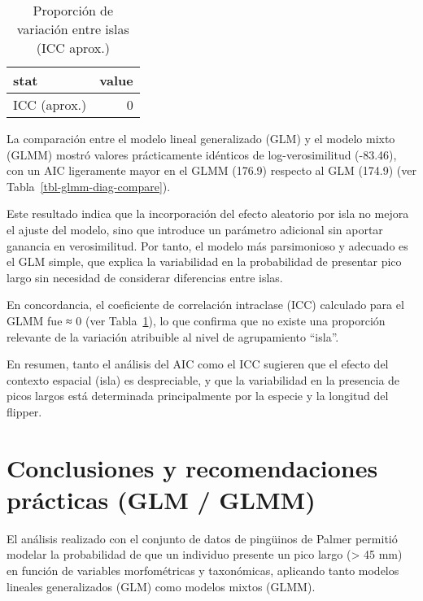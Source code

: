 \documentclass[
  spanish,
  11pt,
  a4paper,
  DIV=11,
  numbers=noendperiod]{scrartcl}
\begin{document}
\begin{longtable}[]{@{}lr@{}}

\caption{\label{tbl-glmm-logistic}Proporción de variación entre islas
(ICC aprox.)}

\tabularnewline

\toprule\noalign{}
stat & value \\
\midrule\noalign{}
\endhead
\bottomrule\noalign{}
\endlastfoot
ICC (aprox.) & 0 \\

\end{longtable}

La comparación entre el modelo lineal generalizado (GLM) y el modelo
mixto (GLMM) mostró valores prácticamente idénticos de log-verosimilitud
(-83.46), con un AIC ligeramente mayor en el GLMM (176.9) respecto al
GLM (174.9) (ver Tabla~\ref{tbl-glmm-diag-compare}).

Este resultado indica que la incorporación del efecto aleatorio por isla
no mejora el ajuste del modelo, sino que introduce un parámetro
adicional sin aportar ganancia en verosimilitud. Por tanto, el modelo
más parsimonioso y adecuado es el GLM simple, que explica la
variabilidad en la probabilidad de presentar pico largo sin necesidad de
considerar diferencias entre islas.

En concordancia, el coeficiente de correlación intraclase (ICC)
calculado para el GLMM fue ≈ 0 (ver Tabla~\ref{tbl-glmm-logistic}), lo
que confirma que no existe una proporción relevante de la variación
atribuible al nivel de agrupamiento ``isla''.

En resumen, tanto el análisis del AIC como el ICC sugieren que el efecto
del contexto espacial (isla) es despreciable, y que la variabilidad en
la presencia de picos largos está determinada principalmente por la
especie y la longitud del flipper.

\section{Conclusiones y recomendaciones prácticas (GLM /
GLMM)}\label{conclusiones-y-recomendaciones-pruxe1cticas-glm-glmm}

El análisis realizado con el conjunto de datos de pingüinos de Palmer
permitió modelar la probabilidad de que un individuo presente un pico
largo (\textgreater{} 45 mm) en función de variables morfométricas y
taxonómicas, aplicando tanto modelos lineales generalizados (GLM) como
modelos mixtos (GLMM).
\end{document}
